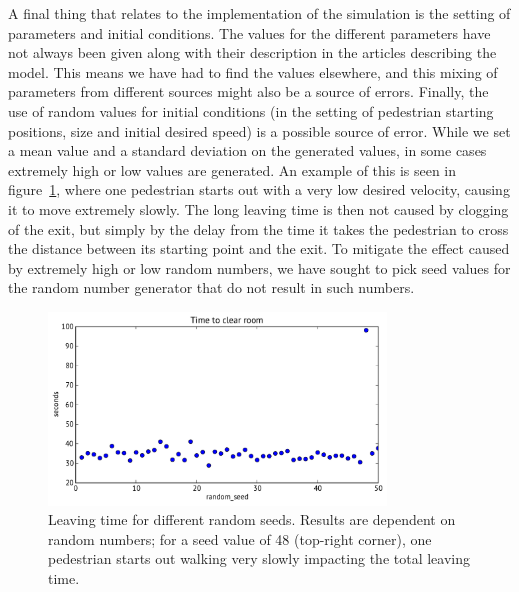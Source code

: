 A final thing that relates to the implementation of the simulation is the 
setting of parameters and initial conditions. The values for the different 
parameters have not always been given along with their description in the 
articles describing the model. This means we have had to find the values 
elsewhere, and this mixing of parameters from different sources might also be 
a source of errors. 
Finally, the use of random values for initial conditions 
(in the setting of pedestrian starting positions, size and initial desired 
speed) is a possible source of error. While we set a mean value and a standard 
deviation on the generated values, in some cases extremely high or low values 
are generated. An example of this is seen in figure~\ref{fig:random-seed}, 
where one pedestrian starts out with a very low desired velocity, causing it 
to move extremely slowly. The long leaving time is then not caused by clogging 
of the exit, but simply by the delay from the time it takes the pedestrian to 
cross the distance between its starting point and the exit. To mitigate the 
effect caused by extremely high or low random numbers, we have sought to pick 
seed values for the random number generator that do not result in such 
numbers.

\begin{figure}[h]
    \centering
    \includegraphics[width=0.8\textwidth]{Figures/random-seed-variations.pdf}
    \caption[Leaving time for different random seeds]{Leaving time for 
    different random seeds. Results are dependent on random numbers; for a 
    seed value of 48 (top-right corner), one pedestrian starts out walking 
    very slowly impacting the total leaving time.}
    \label{fig:random-seed}
\end{figure}


